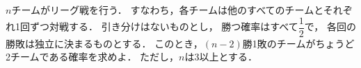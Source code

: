 \documentclass[../../main.tex]{subfiles}
\begin{document}
$n$チームがリーグ戦を行う．
すなわち，各チームは他のすべてのチームとそれぞれ1回ずつ対戦する．
引き分けはないものとし，
勝つ確率はすべて$\displaystyle\dfrac{1}{2}$で，
各回の勝敗は独立に決まるものとする．
このとき，$(n-2)$勝1敗のチームがちょうど2チームである確率を求めよ．
ただし，$n$は3以上とする．
\end{document}
